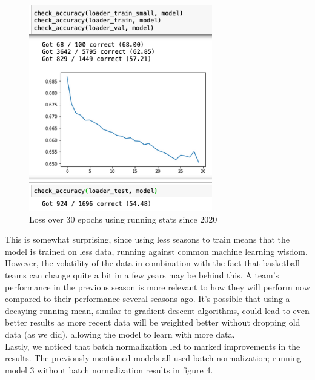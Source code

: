 \documentclass[10pt,twocolumn,letterpaper]{article}
\begin{document}
\begin{figure}[htp]
    \centering
    \includegraphics[width=8cm]{results_2020_train.png}
    \caption{Loss over 30 epochs using running stats since 2020}
    \label{fig:fig_3}
\end{figure}

This is somewhat surprising, since using less seasons to train means that the model is trained on less data, running against common machine learning wisdom. However, the volatility of the data in combination with the fact that basketball teams can change quite a bit in a few years may be behind this. A team's performance in the previous season is more relevant to how they will perform now compared to their performance several seasons ago. It's possible that using a decaying running mean, similar to gradient descent algorithms, could lead to even better results as more recent data will be weighted better without dropping old data (as we did), allowing the model to learn with more data. \\

Lastly, we noticed that batch normalization led to marked improvements in the results. The previously mentioned models all used batch normalization; running model 3 without batch normalization results in figure 4. \\
\end{document}
